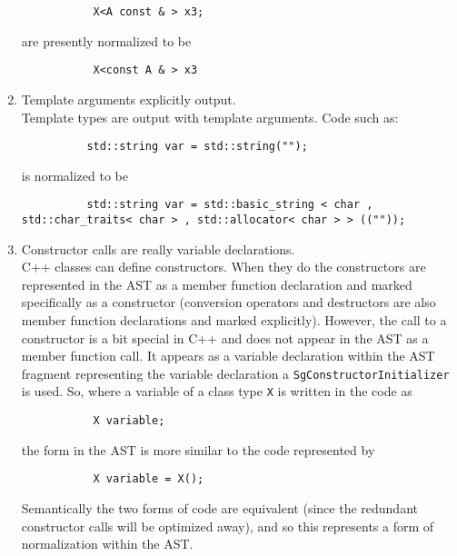 \begin{enumerate}
{{\begin{verbatim}
           X<A const & > x3;
\end{verbatim}
}}
     are presently normalized to be
{\indent
{\mySmallFontSize

\begin{verbatim}
           X<const A & > x3
\end{verbatim}
}}
     \item Template arguments explicitly output. \\
          Template types are output with template arguments.
     Code such as:
{\indent
{\mySmallFontSize
\begin{verbatim}
          std::string var = std::string("");
\end{verbatim}
}}
     is normalized to be
{\indent
{\mySmallFontSize
\begin{verbatim}
          std::string var = std::basic_string < char , std::char_traits< char > , std::allocator< char > > ((""));
\end{verbatim}
}}

     \item Constructor calls are really variable declarations. \\
          C++ classes can define constructors. When they do the constructors 
     are represented in the AST as a member function declaration and marked
     specifically as a constructor (conversion operators and destructors are
     also member function declarations and marked explicitly).  However,
     the call to a constructor is a bit special in C++ and does not appear
     in the AST as a member function call. It appears as a variable declaration
     within the AST fragment representing the variable declaration a
     {\tt SgConstructorInitializer} is used.  So, where a variable of a class type {\tt X} 
     is written in the code as
{\indent
{\mySmallFontSize
\begin{verbatim}
           X variable;
\end{verbatim}
}}
     the form in the AST is more similar to the code represented by
{\indent
{\mySmallFontSize
\begin{verbatim}
           X variable = X();
\end{verbatim}
}}
     Semantically the two forms of code are equivalent (since the redundant constructor calls will
     be optimized away), and so this represents a form of normalization within the AST.


\end{enumerate}
